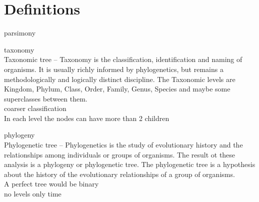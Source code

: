   \section{Definitions}
    \begin{definition} parsimony \cite{Cunningham1998}
    \end{definition}
    \begin{definition} taxonomy \\
      Taxonomic tree – Taxonomy is the classification, identification and naming of organisms. It is 
        usually richly informed by phylogenetics, but remains a methodologically and logically 
        distinct discipline. The Taxonomic levels are Kingdom, Phylum, Class, Order, Family, Genus, 
        Species and maybe some superclasses between them. \\
      coarser classification \\
      In each level the nodes can have more than 2 children
    \end{definition}
    \begin{definition} phylogeny \\
      Phylogenetic tree – Phylogenetics is the study of evolutionary history and the relationships 
        among individuals or groups of organisms. The result ot these analysis is a  phylogeny or 
        phylogenetic tree. The phylogenetic tree is a hypothesis about the history of the evolutionary 
        relationships of a group of organisms. \\
      A perfect tree would be binary \\
      no levels only time
       \cite{Hinchliff2015}
    \end{definition}
